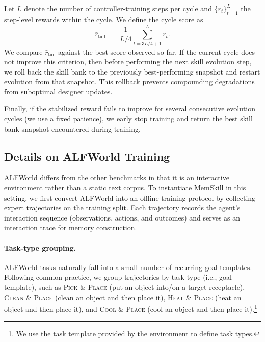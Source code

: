 Let $L$ denote the number of controller-training steps per cycle and $\{r_t\}_{t=1}^{L}$ the step-level rewards within the cycle. We define the cycle score as
\begin{equation}
\bar{r}_{\text{tail}} \;=\; \frac{1}{L/4}\sum_{t=3L/4+1}^{L} r_t .
\end{equation}
We compare $\bar{r}_{\text{tail}}$ against the best score observed so far. If the current cycle does not improve this criterion, then before performing the next skill evolution step, we roll back the skill bank to the previously best-performing snapshot and restart evolution from that snapshot. This rollback prevents compounding degradations from suboptimal designer updates.

Finally, if the stabilized reward fails to improve for several consecutive evolution cycles (we use a fixed patience), we early stop training and return the best skill bank snapshot encountered during training.







\subsection{Details on ALFWorld Training}
\label{appendix:detail_alfworld}

ALFWorld differs from the other benchmarks in that it is an interactive environment rather than a static text corpus. To instantiate MemSkill in this setting, we first convert ALFWorld into an offline training protocol by collecting expert trajectories on the training split. Each trajectory records the agent's interaction sequence (observations, actions, and outcomes) and serves as an interaction trace for memory construction.

\paragraph{Task-type grouping.}
ALFWorld tasks naturally fall into a small number of recurring goal templates. Following common practice, we group trajectories by task type (i.e., goal template), such as \textsc{Pick \& Place} (put an object into/on a target receptacle), \textsc{Clean \& Place} (clean an object and then place it), \textsc{Heat \& Place} (heat an object and then place it), and \textsc{Cool \& Place} (cool an object and then place it).\footnote{We use the task template provided by the environment to define task types.}

